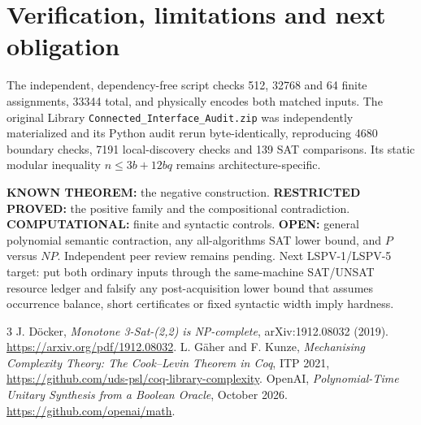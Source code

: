 \documentclass[11pt]{article}
\begin{document}
\section{Verification, limitations and next obligation}
The independent, dependency-free script checks 512, 32768 and 64
finite assignments, 33344 total, and physically encodes both
matched inputs. The original Library \texttt{Connected_Interface_Audit.zip}
was independently materialized and its Python audit rerun
byte-identically, reproducing 4680 boundary checks, 7191
local-discovery checks and 139 SAT comparisons. Its static modular
inequality $n\le3b+12bq$ remains architecture-specific.

\noindent\textbf{KNOWN THEOREM:} the negative construction.
\textbf{RESTRICTED PROVED:} the positive family and the
compositional contradiction.
\textbf{COMPUTATIONAL:} finite and syntactic controls.
\textbf{OPEN:} general polynomial semantic contraction, any
all-algorithms SAT lower bound, and $P$ versus $NP$.
Independent peer review remains pending.
Next LSPV-1/LSPV-5 target: put both ordinary inputs through
the same-machine SAT/UNSAT resource ledger and falsify any
post-acquisition lower bound that assumes occurrence balance,
short certificates or fixed syntactic width imply hardness.

\begin{thebibliography}{3}
 J. D\"ocker, \emph{Monotone 3-Sat-(2,2)
is NP-complete}, arXiv:1912.08032 (2019).
\url{https://arxiv.org/pdf/1912.08032}.
 L. G\"aher and F. Kunze,
\emph{Mechanising Complexity Theory: The Cook--Levin Theorem in Coq},
ITP 2021, \url{https://github.com/uds-psl/coq-library-complexity}.
 OpenAI, \emph{Polynomial-Time Unitary Synthesis
from a Boolean Oracle}, October 2026.
\url{https://github.com/openai/math}.
\end{thebibliography}
\end{document}
